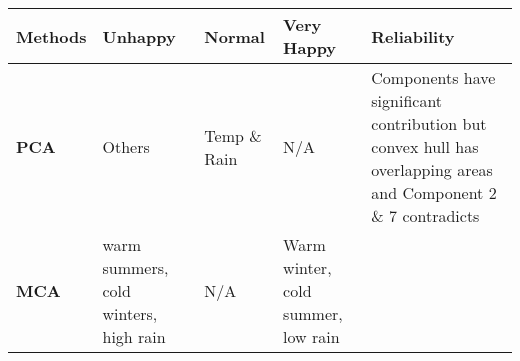\documentclass[]{book}
\begin{document}
\begin{longtable}[]{@{}lllll@{}}
\toprule
\begin{minipage}[b]{0.15\columnwidth}\raggedright
\textbf{Methods}\strut
\end{minipage} & \begin{minipage}[b]{0.20\columnwidth}\raggedright
\textbf{Unhappy}\strut
\end{minipage} & \begin{minipage}[b]{0.19\columnwidth}\raggedright
\textbf{Normal}\strut
\end{minipage} & \begin{minipage}[b]{0.22\columnwidth}\raggedright
\textbf{Very Happy}\strut
\end{minipage} & \begin{minipage}[b]{0.10\columnwidth}\raggedright
\textbf{Reliability}\strut
\end{minipage}\tabularnewline
\midrule
\endhead
\begin{minipage}[t]{0.15\columnwidth}\raggedright
\textbf{PCA}\strut
\end{minipage} & \begin{minipage}[t]{0.20\columnwidth}\raggedright
Others\strut
\end{minipage} & \begin{minipage}[t]{0.19\columnwidth}\raggedright
Temp \& Rain\strut
\end{minipage} & \begin{minipage}[t]{0.22\columnwidth}\raggedright
N/A\strut
\end{minipage} & \begin{minipage}[t]{0.10\columnwidth}\raggedright
Components have significant contribution but convex hull has overlapping
areas and Component 2 \& 7 contradicts\strut
\end{minipage}\tabularnewline
\begin{minipage}[t]{0.15\columnwidth}\raggedright
\textbf{MCA}\strut
\end{minipage} & \begin{minipage}[t]{0.20\columnwidth}\raggedright
warm summers, cold winters, high rain\strut
\end{minipage} & \begin{minipage}[t]{0.19\columnwidth}\raggedright
N/A\strut
\end{minipage} & \begin{minipage}[t]{0.22\columnwidth}\raggedright
Warm winter, cold summer, low rain\strut
\end{minipage} & \begin{minipage}[t]{0.10\columnwidth}\raggedright

\end{minipage}
\end{longtable}
\end{document}
